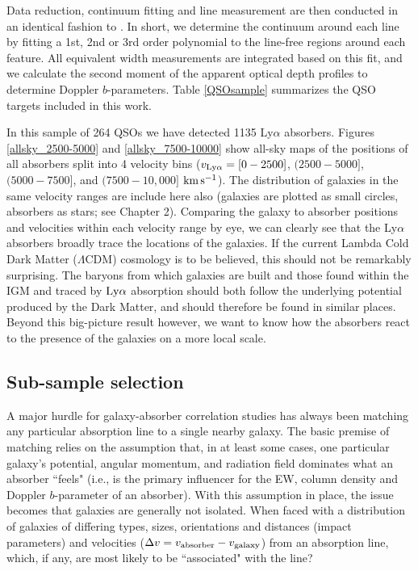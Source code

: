 \documentclass[twocolumn,tighten]{aastex62}
\newcommand{\kms}{$\rm km\, s^{-1}$}
\begin{document}
Data reduction, continuum fitting and line measurement are then conducted in an identical fashion to \cite{french2017}. In short, we determine the continuum around each line by fitting a 1st, 2nd or 3rd order polynomial to the line-free regions around each feature. All equivalent width measurements are integrated based on this fit, and we calculate the second moment of the apparent optical depth profiles to determine Doppler $b$-parameters. Table \ref{QSOsample} summarizes the QSO targets included in this work.

In this sample of 264 QSOs we have detected 1135 Ly$\alpha$ absorbers. Figures \ref{allsky_2500-5000} and \ref{allsky_7500-10000} show all-sky maps of the positions of all absorbers split into 4 velocity bins ($v_{\rm Ly\alpha} = [0 - 2500]$, $(2500 - 5000]$, $(5000 - 7500]$, and $(7500 - 10,000]$ \kms). The distribution of galaxies in the same velocity ranges are include here also (galaxies are plotted as small circles, absorbers as stars; see Chapter 2). Comparing the galaxy to absorber positions and velocities within each velocity range by eye, we can clearly see that the Ly$\alpha$ absorbers broadly trace the locations of the galaxies. If the current Lambda Cold Dark Matter ($\Lambda$CDM) cosmology is to be believed, this should not be remarkably surprising. The baryons from which galaxies are built and those found within the IGM and traced by $\rm Ly\alpha$ absorption should both follow the underlying potential produced by the Dark Matter, and should therefore be found in similar places. Beyond this big-picture result however, we want to know how the absorbers react to the presence of the galaxies on a more local scale.


\subsection{Sub-sample selection}

A major hurdle for galaxy-absorber correlation studies has always been matching any particular absorption line to a single nearby galaxy. The basic premise of matching relies on the assumption that, in at least some cases, one particular galaxy's potential, angular momentum, and radiation field dominates what an absorber ``feels" (i.e., is the primary influencer for the EW, column density and Doppler $b$-parameter of an absorber). With this assumption in place, the issue becomes that galaxies are generally not isolated. When faced with a distribution of galaxies of differing types, sizes, orientations and distances (impact parameters) and velocities ($\Delta v = v_{\rm absorber} - v_{\rm galaxy}$) from an absorption line, which, if any, are most likely to be ``associated" with the line? 
\end{document}
